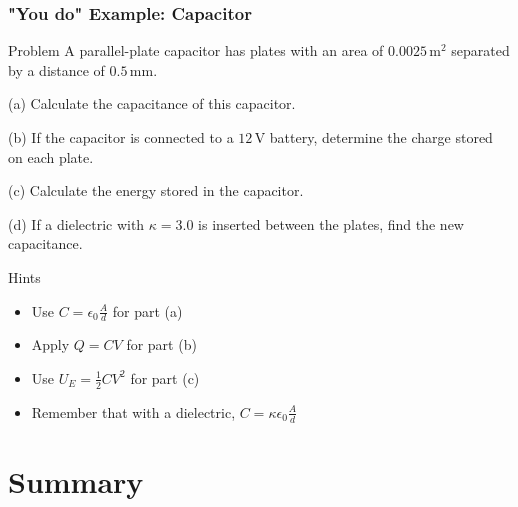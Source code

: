 \documentclass{beamer}
\begin{document}
\begin{frame}
    \frametitle{"You do" Example: Capacitor}
    \begin{block}{Problem}
        A parallel-plate capacitor has plates with an area of $0.0025 \, \text{m}^2$ separated by a distance of $0.5 \, \text{mm}$. 
        
        (a) Calculate the capacitance of this capacitor.
        
        (b) If the capacitor is connected to a $12 \, \text{V}$ battery, determine the charge stored on each plate.
        
        (c) Calculate the energy stored in the capacitor.
        
        (d) If a dielectric with $\kappa = 3.0$ is inserted between the plates, find the new capacitance.
    \end{block}
    
    \begin{block}{Hints}
        \begin{itemize}
            \item Use $C = \epsilon_0 \frac{A}{d}$ for part (a)
            \item Apply $Q = CV$ for part (b)
            \item Use $U_E = \frac{1}{2}CV^2$ for part (c)
            \item Remember that with a dielectric, $C = \kappa\epsilon_0 \frac{A}{d}$
        \end{itemize}
    \end{block}
\end{frame}

\section{Summary}
\end{document}

